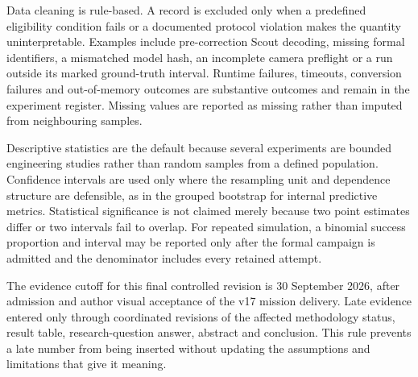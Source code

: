 Data cleaning is rule-based. A record is excluded only when a predefined
eligibility condition fails or a documented protocol violation makes the
quantity uninterpretable. Examples include pre-correction Scout decoding,
missing formal identifiers, a mismatched model hash, an incomplete camera
preflight or a run outside its marked ground-truth interval. Runtime failures,
timeouts, conversion failures and out-of-memory outcomes are substantive
outcomes and remain in the experiment register. Missing values are reported as
missing rather than imputed from neighbouring samples.

Descriptive statistics are the default because several experiments are bounded
engineering studies rather than random samples from a defined population.
Confidence intervals are used only where the resampling unit and dependence
structure are defensible, as in the grouped bootstrap for internal predictive
metrics. Statistical significance is not claimed merely because two point
estimates differ or two intervals fail to overlap. For repeated simulation, a
binomial success proportion and interval may be reported only after the formal
campaign is admitted and the denominator includes every retained attempt.

The evidence cutoff for this final controlled revision is 30 September 2026,
after admission and author visual acceptance of the v17 mission delivery. Late evidence
entered only through coordinated revisions of
the affected methodology status, result table, research-question answer,
abstract and conclusion. This rule prevents a late number from being inserted
without updating the assumptions and limitations that give it meaning.

